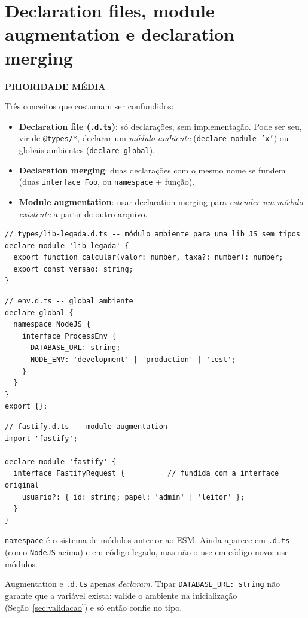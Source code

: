 \documentclass[12pt,a4paper,oneside]{book}
\newcommand{\media}{\colorbox{orange!20}{\sffamily\scriptsize\bfseries PRIORIDADE MÉDIA}}
\newcommand{\code}[1]{\texttt{#1}}
\begin{document}
\section{Declaration files, module augmentation e declaration merging}
\media

Três conceitos que costumam ser confundidos:

\begin{itemize}
  \item \textbf{Declaration file (\code{.d.ts})}: só declarações, sem implementação. Pode ser seu, vir de \code{@types/*}, declarar um \emph{módulo ambiente} (\code{declare module 'x'}) ou globais ambientes (\code{declare global}).
  \item \textbf{Declaration merging}: duas declarações com o mesmo nome se fundem (duas \code{interface Foo}, ou \code{namespace} + função).
  \item \textbf{Module augmentation}: usar declaration merging para \emph{estender um módulo existente} a partir de outro arquivo.
\end{itemize}

\begin{verbatim}
// types/lib-legada.d.ts -- módulo ambiente para uma lib JS sem tipos
declare module 'lib-legada' {
  export function calcular(valor: number, taxa?: number): number;
  export const versao: string;
}
\end{verbatim}

\begin{verbatim}
// env.d.ts -- global ambiente
declare global {
  namespace NodeJS {
    interface ProcessEnv {
      DATABASE_URL: string;
      NODE_ENV: 'development' | 'production' | 'test';
    }
  }
}
export {};
\end{verbatim}

\begin{verbatim}
// fastify.d.ts -- module augmentation
import 'fastify';

declare module 'fastify' {
  interface FastifyRequest {          // fundida com a interface original
    usuario?: { id: string; papel: 'admin' | 'leitor' };
  }
}
\end{verbatim}

\code{namespace} é o sistema de módulos anterior ao ESM. Ainda aparece em \code{.d.ts} (como \code{NodeJS} acima) e em código legado, mas não o use em código novo: use módulos.

\begin{cuidado}
Augmentation e \code{.d.ts} apenas \emph{declaram}. Tipar \code{DATABASE\_URL: string} não garante que a variável exista: valide o ambiente na inicialização (Seção~\ref{sec:validacao}) e só então confie no tipo.
\end{cuidado}
\end{document}
